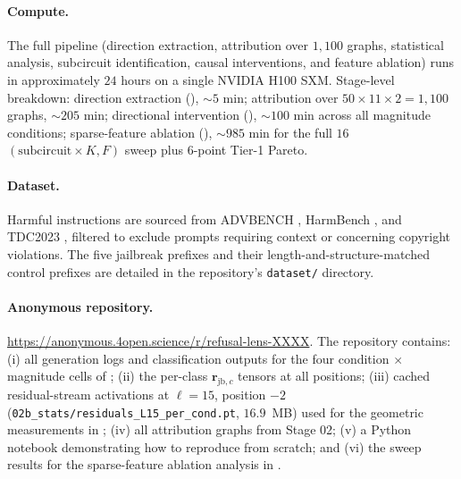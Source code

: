 \documentclass{article}
\newcommand{\rjbc}{\bm{r}_{\mathrm{jb},c}}
\begin{document}
\paragraph{Compute.} The full pipeline (direction extraction,
attribution over $1{,}100$ graphs, statistical analysis,
subcircuit identification, causal interventions, and feature
ablation) runs in approximately $24$ hours on a single
NVIDIA H100 SXM. Stage-level breakdown:
direction extraction (), $\sim 5$ min;
attribution over $50 \times 11 \times 2 = 1{,}100$ graphs,
$\sim 205$ min; directional intervention
(), $\sim 100$ min across
all magnitude conditions; sparse-feature ablation
(), $\sim 985$ min for the full $16$
$(\text{subcircuit} \times K, F)$ sweep plus $6$-point Tier-1
Pareto.

\paragraph{Dataset.} Harmful instructions are sourced from
ADVBENCH \citep{zou2023universal}, HarmBench
\citep{mazeika2024harmbench}, and TDC2023 \citep{mazeika2023tdc},
filtered to exclude prompts requiring context or concerning
copyright violations. The five jailbreak prefixes and their
length-and-structure-matched control prefixes are detailed in the
repository's \texttt{dataset/} directory.

\paragraph{Anonymous repository.}
\url{https://anonymous.4open.science/r/refusal-lens-XXXX}.
The repository contains: (i) all generation logs and classification
outputs for the four condition $\times$ magnitude cells of
; (ii) the per-class $\rjbc$ tensors at all
positions; (iii) cached residual-stream activations at $\ell = 15$,
position $-2$
(\texttt{02b\_stats/residuals\_L15\_per\_cond.pt}, $16.9$~MB) used
for the geometric measurements in ; (iv) all
attribution graphs from Stage 02; (v) a Python notebook
demonstrating how to reproduce
 from scratch; and (vi) the
sweep results for the sparse-feature ablation analysis in
.
\end{document}
